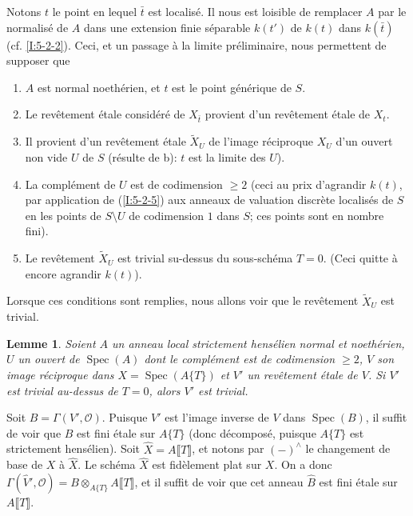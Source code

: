 \documentclass{book}
\DeclareMathOperator{\spec}{Spec}
\newcommand{\cO}{\mathcal{O}}
\newtheorem{lemma}[subsubsection]{Lemme}
\begin{document}
Notons $t$ le point en lequel $\bar t$ est localisé. Il nous est loisible de 
remplacer $A$ par le normalisé de $A$ dans une extension finie séparable 
$k(t')$ de $k(t)$ dans $k(\bar t)$ (cf. \ref{I:5-2-2}). Ceci, et un passage à 
la limite préliminaire, nous permettent de supposer que 
\begin{enumerate}[\indent a)]
  \item $A$ est normal noethérien, et $t$ est le point générique de $S$.
  \item Le revêtement étale considéré de $X_{\bar t}$ provient d'un 
    revêtement étale de $X_t$. 
  \item Il provient d'un revêtement étale $\widetilde X_U$ de l'image 
    réciproque $X_U$ d'un ouvert non vide $U$ de $S$ (résulte de b): $t$ 
    est la limite des $U$).
  \item La complément de $U$ est de codimension $\geqslant 2$ (ceci au prix 
    d'agrandir $k(t)$, par application de (\ref{I:5-2-5}) aux anneaux de 
    valuation discrète localisés de $S$ en les points de $S\setminus U$ de 
    codimension $1$ dans $S$; ces points sont en nombre fini). 
  \item Le revêtement $\widetilde X_U$ est trivial su-dessus du sous-schéma 
    $T=0$. (Ceci quitte à encore agrandir $k(t)$). 
\end{enumerate}

Lorsque ces conditions sont remplies, nous allons voir que le revêtement 
$\widetilde X_U$ est trivial. 





\begin{lemma}\label{I:5-2-7} %
Soient $A$ un anneau local strictement hensélien normal et noethérien, $U$ 
un ouvert de $\spec(A)$ dont le complément est de codimension $\geqslant 2$, 
$V$ son image réciproque dans $X=\spec\left(A\{T\}\right)$ et $V'$ un 
revêtement étale de $V$. Si $V'$ est trivial au-dessus de $T=0$, alors $V'$ 
est trivial. 
\end{lemma}

Soit $B=\Gamma(V',\cO)$. Puisque $V'$ est l'image inverse de $V$ dans 
$\spec(B)$, il suffit de voir que $B$ est fini étale sur $A\{T\}$ (donc 
décomposé, puisque $A\{T\}$ est strictement hensélien). Soit 
$\widehat X=A\llbracket T\rrbracket$, et notons par $(-)^\wedge$ le changement 
de base de $X$ à $\widehat X$. Le schéma $\widehat X$ est fidèlement plat 
sur $X$. On a donc 
$\Gamma(\widehat V',\cO) = B\otimes_{A\{T\}} A\llbracket T\rrbracket$, et il 
suffit de voir que cet anneau $\widehat B$ est fini étale sur 
$A\llbracket T\rrbracket$. 
\end{document}
